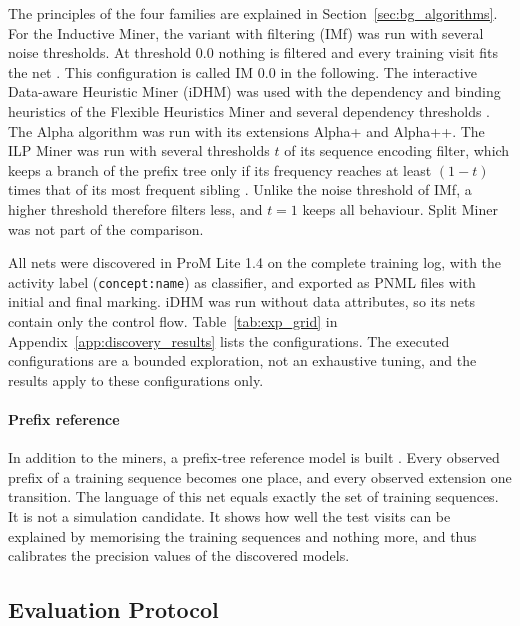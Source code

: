 The principles of the four families are explained in Section~\ref{sec:bg_algorithms}.
For the Inductive Miner, the variant with filtering (IMf) was run with several noise
thresholds. At threshold 0.0 nothing is filtered and every training visit fits the
net \cite{Leemans2014InductiveMiner}. This configuration is called IM 0.0 in the
following. The interactive Data-aware Heuristic Miner (iDHM) was used with the
dependency and binding heuristics of the Flexible Heuristics Miner and several
dependency thresholds \cite{Weijters2011FHM,Mannhardt2017iDHM}. The Alpha algorithm
was run with its extensions Alpha+ and Alpha++. The ILP Miner was run with several
thresholds $t$ of its sequence encoding filter, which keeps a branch of the prefix
tree only if its frequency reaches at least $(1-t)$ times that of its most frequent
sibling \cite{RWVanZelst2018ILP}. Unlike the noise threshold of IMf, a higher
threshold therefore filters less, and $t = 1$ keeps all behaviour. Split Miner was
not part of the comparison.

All nets were discovered in ProM Lite 1.4 \cite{vanDongen2005ProM} on the complete
training log, with the activity label (\texttt{concept:name}) as classifier, and
exported as PNML files with initial and final marking. iDHM was run without data
attributes, so its nets contain only the control flow.
Table~\ref{tab:exp_grid} in Appendix~\ref{app:discovery_results} lists the
configurations. The executed configurations are a bounded exploration, not an
exhaustive tuning, and the results apply to these configurations only.

\paragraph{Prefix reference}
In addition to the miners, a prefix-tree reference model is built
\cite{DeLaBriandais1959Trie}. Every observed prefix of a training sequence becomes
one place, and every observed extension one transition. The language of this net
equals exactly the set of training sequences. It is not a simulation candidate. It
shows how well the test visits can be explained by memorising the training
sequences and nothing more, and thus calibrates the precision values of the
discovered models.

\subsection{Evaluation Protocol}
\label{sec:exp_discovery_eval}

